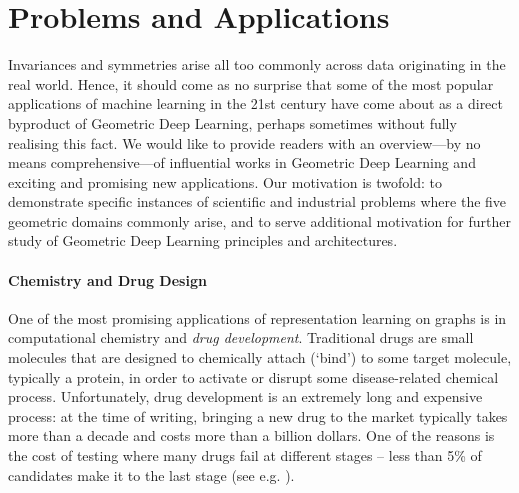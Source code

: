 

\section{Problems and Applications}

Invariances and symmetries arise all too commonly across data originating in the real world. Hence, it should come as no surprise that some of the most popular applications of machine learning in the 21st century have come about as a direct byproduct of Geometric Deep Learning, perhaps sometimes without fully realising this fact. 
%
We would like to provide readers with an overview---by no means comprehensive---of influential works in Geometric Deep Learning and exciting and promising new applications. Our motivation is twofold: to demonstrate specific instances of scientific and industrial problems where the five geometric domains commonly arise, and to serve additional motivation for further study of Geometric Deep Learning principles and architectures.



\paragraph{Chemistry and Drug Design} One of the most promising applications of representation learning on graphs is in computational chemistry and \emph{drug development}. 
%
Traditional drugs are small molecules that are designed
to chemically attach (`bind') to some target molecule, typically a protein, in order to activate or disrupt some disease-related chemical process. 
%
Unfortunately, drug development is an extremely long and expensive process: 
at the time of writing, 
bringing a new drug to the market typically takes more than a decade and costs more than a billion dollars. 
%
One of the reasons is the cost of testing 
where many drugs fail at different stages -- less than 5\% of candidates make it to the last stage (see e.g. \cite{gaudelet2020utilising}). 




